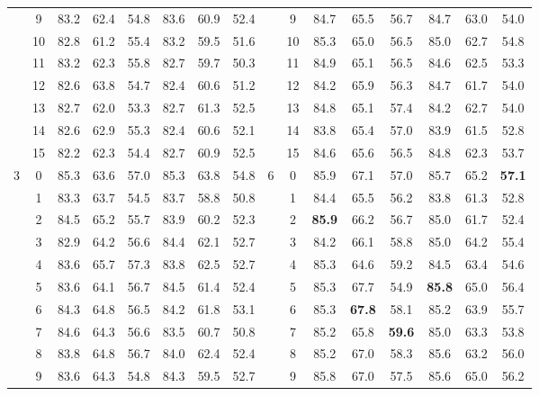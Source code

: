 \begin{table}[p]
{\begin{tabular}{c c | c c c | c c c || c c | c c c | c c c}
             & 9 & 83.2 & 62.4 & 54.8 & 83.6 & 60.9 & 52.4 &  & 9 & 84.7 & 65.5 & 56.7 & 84.7 & 63.0 & 54.0 \\
             & 10 & 82.8 & 61.2 & 55.4 & 83.2 & 59.5 & 51.6 &  & 10 & 85.3 & 65.0 & 56.5 & 85.0 & 62.7 & 54.8 \\
             & 11 & 83.2 & 62.3 & 55.8 & 82.7 & 59.7 & 50.3 &  & 11 & 84.9 & 65.1 & 56.5 & 84.6 & 62.5 & 53.3 \\
             & 12 & 82.6 & 63.8 & 54.7 & 82.4 & 60.6 & 51.2 &  & 12 & 84.2 & 65.9 & 56.3 & 84.7 & 61.7 & 54.0 \\
             & 13 & 82.7 & 62.0 & 53.3 & 82.7 & 61.3 & 52.5 &  & 13 & 84.8 & 65.1 & 57.4 & 84.2 & 62.7 & 54.0 \\
             & 14 & 82.6 & 62.9 & 55.3 & 82.4 & 60.6 & 52.1 &  & 14 & 83.8 & 65.4 & 57.0 & 83.9 & 61.5 & 52.8 \\
             & 15 & 82.2 & 62.3 & 54.4 & 82.7 & 60.9 & 52.5 &  & 15 & 84.6 & 65.6 & 56.5 & 84.8 & 62.3 & 53.7 \\
            \midrule
            \multirow{16}{*}{3} & 0 & 85.3 & 63.6 & 57.0 & 85.3 & 63.8 & 54.8 & \multirow{16}{*}{6} & 0 & 85.9 & 67.1 & 57.0 & 85.7 & 65.2 & \textbf{57.1} \\
             & 1 & 83.3 & 63.7 & 54.5 & 83.7 & 58.8 & 50.8 &  & 1 & 84.4 & 65.5 & 56.2 & 83.8 & 61.3 & 52.8 \\
             & 2 & 84.5 & 65.2 & 55.7 & 83.9 & 60.2 & 52.3 &  & 2 & \textbf{85.9} & 66.2 & 56.7 & 85.0 & 61.7 & 52.4 \\
             & 3 & 82.9 & 64.2 & 56.6 & 84.4 & 62.1 & 52.7 &  & 3 & 84.2 & 66.1 & 58.8 & 85.0 & 64.2 & 55.4 \\
             & 4 & 83.6 & 65.7 & 57.3 & 83.8 & 62.5 & 52.7 &  & 4 & 85.3 & 64.6 & 59.2 & 84.5 & 63.4 & 54.6 \\
             & 5 & 83.6 & 64.1 & 56.7 & 84.5 & 61.4 & 52.4 &  & 5 & 85.3 & 67.7 & 54.9 & \textbf{85.8} & 65.0 & 56.4 \\
             & 6 & 84.3 & 64.8 & 56.5 & 84.2 & 61.8 & 53.1 &  & 6 & 85.3 & \textbf{67.8} & 58.1 & 85.2 & 63.9 & 55.7 \\
             & 7 & 84.6 & 64.3 & 56.6 & 83.5 & 60.7 & 50.8 &  & 7 & 85.2 & 65.8 & \textbf{59.6} & 85.0 & 63.3 & 53.8 \\
             & 8 & 83.8 & 64.8 & 56.7 & 84.0 & 62.4 & 52.4 &  & 8 & 85.2 & 67.0 & 58.3 & 85.6 & 63.2 & 56.0 \\
             & 9 & 83.6 & 64.3 & 54.8 & 84.3 & 59.5 & 52.7 &  & 9 & 85.8 & 67.0 & 57.5 & 85.6 & 65.0 & 56.2 \\

\end{tabular}}
\end{table}
